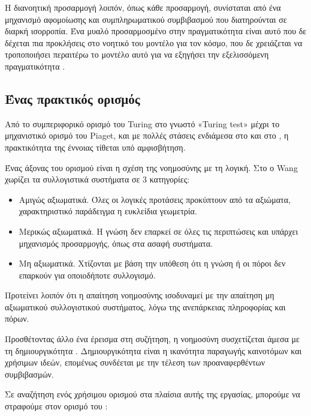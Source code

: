   Η διανοητική προσαρμογή λοιπόν, όπως κάθε προσαρμογή, συνίσταται από ένα μηχανισμό αφομοίωσης και συμπληρωματικού συμβιβασμού που διατηρούνται σε διαρκή ισορροπία.
  Ένα μυαλό προσαρμοσμένο στην πραγματικότητα είναι αυτό που δε δέχεται πια προκλήσεις στο νοητικό του μοντέλο για τον κόσμο,
  που δε χρειάζεται να τροποποιήσει περαιτέρω το μοντέλο αυτό για να εξηγήσει την εξελισσόμενη πραγματικότητα \parencite[σελ 5-7]{piagetOriginsIntelligenceChildren1952}.

\subsection*{Ένας πρακτικός ορισμός}

  Από το συμπεριφορικό ορισμό του Turing στο γνωστό «Turing test» μέχρι το μηχανιστικό ορισμό του Piaget,
  και με πολλές στάσεις ενδιάμεσα στο \cite[Lenat][]{lenatThresholdsKnowledge1991} και στο \cite[Minsky][]{minskySocietyMind1988},
  η πρακτικότητα της έννοιας τίθεται υπό αμφισβήτηση.

  Ένας άξονας του ορισμού είναι η σχέση της νοημοσύνης με τη λογική. Στο \cite{wangCognitiveLogicMathematical}
  ο Wang χωρίζει τα συλλογιστικά συστήματα σε 3 κατηγορίες:
  \begin{itemize}
    \item Αμιγώς αξιωματικά. Όλες οι λογικές προτάσεις προκύπτουν από τα αξιώματα, χαρακτηριστικό παράδειγμα η ευκλείδια γεωμετρία.
    \item Μερικώς αξιωματικά. Η γνώση δεν επαρκεί σε όλες τις περιπτώσεις και υπάρχει μηχανισμός προσαρμογής, όπως στα ασαφή συστήματα.
    \item Μη αξιωματικά. Χτίζονται με βάση την υπόθεση ότι η γνώση ή οι πόροι δεν επαρκούν για οποιοδήποτε συλλογισμό.
  \end{itemize}

  Προτείνει λοιπόν ότι η απαίτηση νοημοσύνης ισοδυναμεί με την απαίτηση μη αξιωματικού συλλογιστικού συστήματος,
  λόγω της ανεπάρκειας πληροφορίας και πόρων.

  Προσθέτοντας άλλο ένα έρεισμα στη συζήτηση, η νοημοσύνη συσχετίζεται άμεσα με τη δημιουργικότητα \parencite{benedekIntelligenceCreativityCognitive2014}.
  Δημιουργικότητα είναι η ικανότητα παραγωγής καινοτόμων και χρήσιμων ιδεών,
  επομένως συνδέεται με την τέλεση των προαναφερθέντων συμβιβασμών.
  \bigskip

  Σε αναζήτηση ενός χρήσιμου ορισμού στα πλαίσια αυτής της εργασίας, μπορούμε να στραφούμε στον ορισμό του \cite[Wang][]{wangWorkingDefinitionIntelligence1995}:

